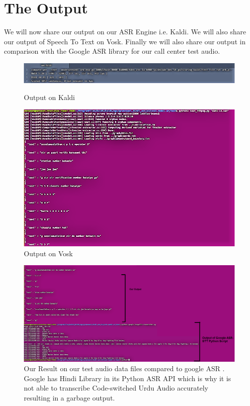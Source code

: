 
\chapter{The Output}    
\label{App_A}
We will now share our output on our ASR Engine i.e. Kaldi. We will also share our output of Speech To Text on Vosk. Finally we will also share our output in comparison with the Google ASR library \cite{zhang_uberi_speechrecognition_nodate} for our call center test audio.

\begin{landscape}
\begin{figure}[ht]
    \centering
    \includegraphics[width=1.45\textwidth]{img/RESULTS3.jpg}
    \caption{Output on Kaldi}
    \vspace{11pt}
    \includegraphics[width=1.2\textwidth]{img/Results-1.png}
    \caption{Output on Vosk}
    \label{fig:Result_output}
\end{figure}

\begin{figure}[ht]
    \centering
    \includegraphics[width=1.5\textwidth]{img/Results-2.png}
    \caption{Our Result on our test audio data files compared to google ASR \cite{zhang_uberi_speechrecognition_nodate}. Google has Hindi Library in its Python ASR API which is why it is not able to transcribe Code-switched Urdu Audio accurately resulting in a garbage output.}    \label{fig:Result_output_compare}
\end{figure}   
\end{landscape}


